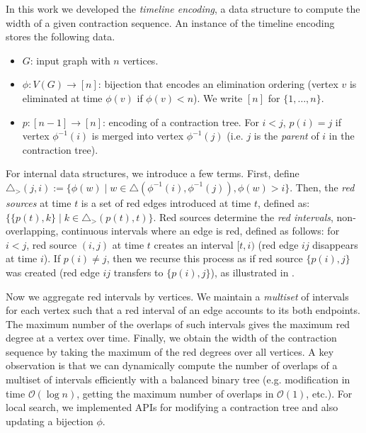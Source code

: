 \documentclass[a4paper,UKenglish,cleveref, autoref, thm-restate]{lipics-v2021}
\begin{document}
In this work we developed the \emph{timeline encoding}, a data structure to 
compute the width of a given contraction sequence.
An instance of the timeline encoding stores the following data.

\begin{itemize}
    \item $G$: input graph with $n$ vertices.
    \item $\phi: V(G) \to [n]$: bijection that encodes an elimination ordering
    (vertex $v$ is eliminated at time $\phi(v)$ if $\phi(v)<n$).
    We write $[n]$ for $\{1,\ldots,n\}$.
    \item $p: [n - 1] \to [n]$: encoding of a contraction tree.
    For $i<j$, $p(i)=j$ if vertex $\phi^{-1}(i)$ is merged into vertex $\phi^{-1}(j)$
    (i.e. $j$ is the \emph{parent} of $i$ in the contraction tree).
\end{itemize}

For internal data structures, we introduce a few terms.
%
First, define $\triangle_{>}(j,i)
:= \{\phi(w) \mid w \in \triangle(\phi^{-1}(i), \phi^{-1}(j)), \phi(w) > i\}$.
%
Then, the \emph{red sources} at time $t$ is a set of red edges
introduced at time $t$, defined as:
$\{\{p(t), k\} \mid k \in \triangle_{>}(p(t), t)\}$.
%
Red sources determine the \emph{red intervals},
non-overlapping, continuous intervals where an edge is red, defined as follows:
%
for $i<j$, red source $(i, j)$ at time $t$ creates an interval $[t,i)$
(red edge $ij$ disappears at time $i$).
If $p(i) \neq j$, then we recurse this process as if red source $\{p(i), j\}$ was created
(red edge $ij$ transfers to $\{p(i),j\}$),
as illustrated in .

Now we aggregate red intervals by vertices.
%
We maintain a \emph{multiset} of intervals for each vertex
such that a red interval of an edge accounts to its both endpoints.
%
The maximum number of the overlaps of such intervals gives
the maximum red degree at a vertex over time.
%
Finally, we obtain the width of the contraction sequence by
taking the maximum of the red degrees over all vertices.
%
A key observation is that we can dynamically compute the number of overlaps of a multiset of
intervals efficiently with a balanced binary tree
(e.g. modification in time $\mathcal{O}(\log n)$,
getting the maximum number of overlaps in $\mathcal{O}(1)$, etc.).
%
For local search, we implemented APIs for modifying a contraction tree
and also updating a bijection $\phi$.
\end{document}
